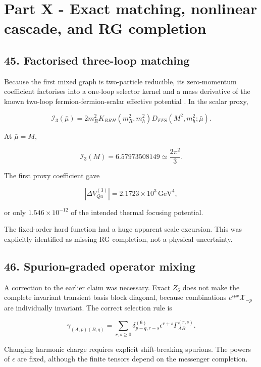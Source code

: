 \documentclass[
]{article}
\begin{document}
\section{Part X - Exact matching, nonlinear cascade, and RG
completion}\label{part-x---exact-matching-nonlinear-cascade-and-rg-completion}

\subsection{45. Factorised three-loop
matching}\label{factorised-three-loop-matching}

Because the first mixed graph is two-particle reducible, its
zero-momentum coefficient factorises into a one-loop selector kernel and
a mass derivative of the known two-loop fermion-fermion-scalar effective
potential . In the scalar proxy,

\[
\mathcal I_3(\bar\mu)
=2m_R^2K_{RRH}(m_R^2,m_h^2)
D_{FFS}(M^2,m_h^2;\bar\mu).
\]

At \(\bar\mu=M\),

\[
\boxed{
\mathcal I_3(M)=6.57973508149\simeq\frac{2\pi^2}{3}.
}
\]

The first proxy coefficient gave

\[
|\Delta V_{Qa}^{(3)}|
=2.1723\times10^3\,\mathrm{GeV}^4,
\]

or only \(1.546\times10^{-12}\) of the intended thermal focusing
potential.

The fixed-order hard function had a huge apparent scale excursion. This
was explicitly identified as missing RG completion, not a physical
uncertainty.

\subsection{46. Spurion-graded operator
mixing}\label{spurion-graded-operator-mixing}

A correction to the earlier claim was necessary. Exact \(Z_6\) does not
make the complete invariant transient basis block diagonal, because
combinations \(e^{ipx}\mathcal X_{-p}\) are individually invariant. The
correct selection rule is

\[
\boxed{
\gamma_{(A,p)(B,q)}
=\sum_{r,s\ge0}
\delta^{(6)}_{p-q,r-s}
\epsilon^{r+s}\Gamma_{AB}^{(r,s)}.
}
\]

Changing harmonic charge requires explicit shift-breaking spurions. The
powers of \(\epsilon\) are fixed, although the finite tensors depend on
the messenger completion.
\end{document}
